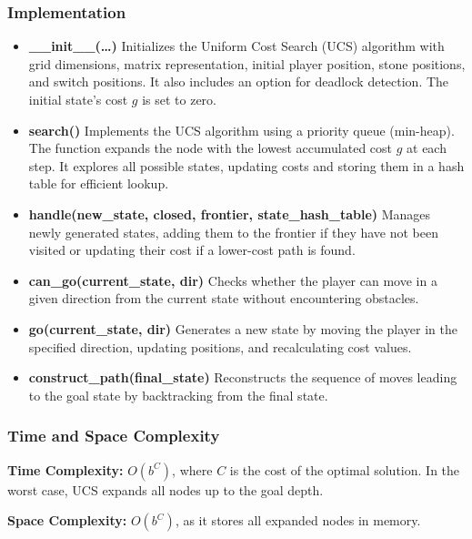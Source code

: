 \subsubsection{Implementation}
\begin{itemize}
	\item \textbf{\_\_init\_\_(\ldots)}
	      Initializes the Uniform Cost Search (UCS) algorithm with grid dimensions, matrix representation, initial player position, stone positions, and switch positions. It also includes an option for deadlock detection. The initial state's cost \( g \) is set to zero.

	\item \textbf{search()}
	      Implements the UCS algorithm using a priority queue (min-heap). The function expands the node with the lowest accumulated cost \( g \) at each step. It explores all possible states, updating costs and storing them in a hash table for efficient lookup.

	\item \textbf{handle(new\_state, closed, frontier, state\_hash\_table)}
	      Manages newly generated states, adding them to the frontier if they have not been visited or updating their cost if a lower-cost path is found.

	\item \textbf{can\_go(current\_state, dir)}
	      Checks whether the player can move in a given direction from the current state without encountering obstacles.

	\item \textbf{go(current\_state, dir)}
	      Generates a new state by moving the player in the specified direction, updating positions, and recalculating cost values.

	\item \textbf{construct\_path(final\_state)}
	      Reconstructs the sequence of moves leading to the goal state by backtracking from the final state.
\end{itemize}

\subsubsection{Time and Space Complexity}
\textbf{Time Complexity:} \( O(b^C) \), where \( C \) is the cost of the optimal solution. In the worst case, UCS expands all nodes up to the goal depth.

\textbf{Space Complexity:} \( O(b^C) \), as it stores all expanded nodes in memory.
